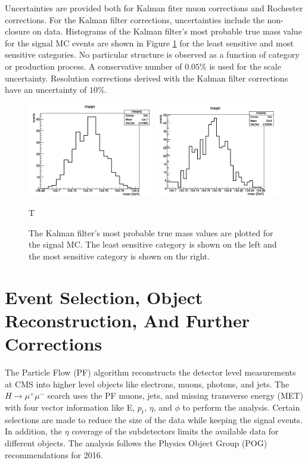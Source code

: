 Uncertainties are provided both for Kalman fiter muon corrections and Rochester corrections.
For the Kalman filter corrections, uncertainties include the non-closure on data. Histograms of the Kalman filter's most probable true mass value for the signal MC events are shown in Figure \ref{fig:shifts_scale} for the least sensitive and most sensitive categories. No particular structure is observed as a function of category or production process. A conservative number of $0.05\%$ is used for the scale uncertainty. Resolution corrections derived with the Kalman filter corrections have an uncertainty of $10\%$.
\begin{figure}[!h]
    \centering
    \includegraphics[width=0.49\textwidth]{images/muon_calib/syst_GluGlu_cat0.png}
    \includegraphics[width=0.49\textwidth]{images/muon_calib/syst_GluGlu_cat12.png}
    \caption[Kalman filter statistical uncertainty on the dimuon mass.]
    {The Kalman filter's most probable true mass values are plotted for the signal MC. The least sensitive category is shown on the left and the most sensitive category is shown on the right.}
    \label{fig:shifts_scale} T
\end{figure}
\section{Event Selection, Object Reconstruction, And Further Corrections}

The Particle Flow (PF) algorithm reconstructs the detector level measurements at CMS into higher level objects like electrons, muons, photons, and jets. The $H\rightarrow\mu^+\mu^-$ search uses the PF muons, jets, and missing transverse energy (MET) with four vector information like E, $p_t$, $\eta$, and $\phi$ to perform the analysis. Certain selections are made to reduce the size of the data while keeping the signal events. In addition, the $\eta$ coverage of the subdetectors limits the available data for different objects. The analysis follows the Physics Object Group (POG) recommendations for 2016. 

